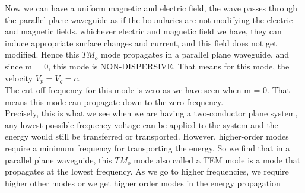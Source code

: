 Now we can have a uniform magnetic and electric field, the wave passes through the parallel plane waveguide as if the boundaries are not modifying the electric and magnetic fields. whichever electric and magnetic field we have, they can induce appropriate surface changes and current, and this field does not get modified. Hence this $TM_o$ mode propagates in a parallel plane waveguide, and since m = 0, this mode is NON-DISPERSIVE. That means for this mode, the velocity $V_{p}=V_{g}=c$.\\
The cut-off frequency for this mode is zero as we have seen when m = 0. That means this mode can propagate down to the zero frequency.\\
Precisely, this is what we see when we are having a two-conductor plane system, any lowest possible frequency voltage can be applied to the system and the energy would still be transferred or transported. However, higher-order modes require a minimum frequency for transporting the energy. So we find that in a parallel plane waveguide, this $TM_o$ mode also called a TEM mode is a mode that propagates at the lowest frequency. As we go to higher frequencies, we require higher other modes or we get higher order modes in the energy propagation\\
